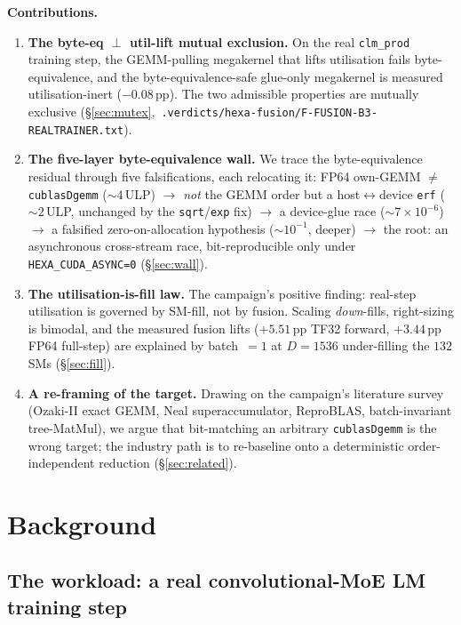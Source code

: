 \documentclass[11pt,a4paper]{article}
\newcommand{\verdict}[1]{\texttt{.verdicts/hexa-fusion/#1}}
\begin{document}
\medskip
\noindent\textbf{Contributions.}
\begin{enumerate}\itemsep0.3em
\item \textbf{The byte-eq $\perp$ util-lift mutual exclusion.} On the real
\texttt{clm\_prod} training step, the GEMM-pulling megakernel that lifts
utilisation fails byte-equivalence, and the byte-equivalence-safe
glue-only megakernel is measured utilisation-inert ($-0.08$\,pp). The two
admissible properties are mutually exclusive
(\S\ref{sec:mutex},~\verdict{F-FUSION-B3-REALTRAINER.txt}).
\item \textbf{The five-layer byte-equivalence wall.} We trace the
byte-equivalence residual through five falsifications, each relocating it:
FP64 own-GEMM $\neq$ \texttt{cublasDgemm} (${\sim}4$\,ULP) $\to$ \emph{not}
the GEMM order but a host$\leftrightarrow$device \texttt{erf}
(${\sim}2$\,ULP, unchanged by the \texttt{sqrt}/\texttt{exp} fix) $\to$ a
device-glue race (${\sim}7\times10^{-6}$) $\to$ a falsified
zero-on-allocation hypothesis (${\sim}10^{-1}$, deeper) $\to$ the root: an
asynchronous cross-stream race, bit-reproducible only under
\texttt{HEXA\_CUDA\_ASYNC=0} (\S\ref{sec:wall}).
\item \textbf{The utilisation-is-fill law.} The campaign's positive finding:
real-step utilisation is governed by SM-fill, not by fusion. Scaling
\emph{down}-fills, right-sizing is bimodal, and the measured fusion lifts
($+5.51$\,pp TF32 forward, $+3.44$\,pp FP64 full-step) are explained by
batch~$=1$ at $D{=}1536$ under-filling the $132$ SMs (\S\ref{sec:fill}).
\item \textbf{A re-framing of the target.} Drawing on the campaign's
literature survey (Ozaki-II exact GEMM, Neal superaccumulator, ReproBLAS,
batch-invariant tree-MatMul), we argue that bit-matching an arbitrary
\texttt{cublasDgemm} is the wrong target; the industry path is to
re-baseline onto a deterministic order-independent reduction
(\S\ref{sec:related}).
\end{enumerate}

\section{Background}
\label{sec:bg}

\subsection{The workload: a real convolutional-MoE LM training step}
\end{document}
